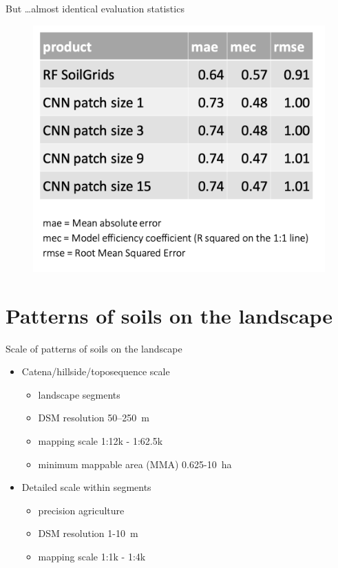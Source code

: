 \documentclass[aspectratio=169]{beamer}
\begin{document}
\begin{frame}{But \ldots almost identical evaluation statistics}
    \begin{figure}
        \centering
\includegraphics[height=0.7\textheight]{./graphics_david/Genova_poster_stats.png}
     \end{figure}
\end{frame}

\section{Patterns of soils on the landscape}

\begin{frame}{Scale of patterns of soils on the landscape}
\begin{itemize}
    \item Catena/hillside/toposequence scale
    \begin{itemize}
        \item landscape segments
        \item DSM resolution 50--250~m
        \item mapping scale 1:12k - 1:62.5k
        \item minimum mappable area (MMA) 0.625-10~ha
        \end{itemize}
    \item Detailed scale within segments
    \begin{itemize}
        \item precision agriculture
        \item DSM resolution 1-10~m
        \item mapping scale 1:1k - 1:4k
    \end{itemize}
\end{itemize}
\end{frame}
\end{document}
